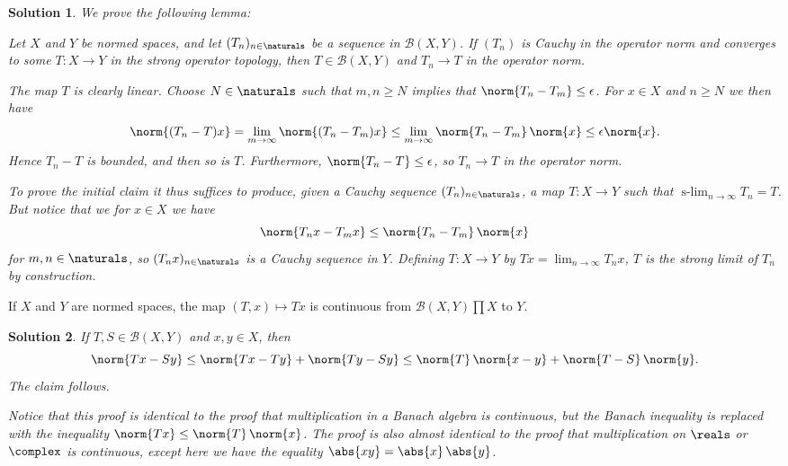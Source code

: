 \documentclass[article, a4paper, 11pt, oneside]{memoir}
\numberwithin{equation}{chapter}
\newcommand{\calB}{\mathcal{B}}
\DeclareMathOperator*{\slim}{s-lim}
\newenvironment{displaytheorem}{%
	\begin{displayquote}\itshape%
}{%
	\end{displayquote}%
}
\theoremstyle{nonumberplain}
\newtheorem{solution}{Solution}
\begin{document}
\begin{solution}
	We prove the following lemma:
	\begin{displaytheorem}
		Let $X$ and $Y$ be normed spaces, and let $(T_n)_{n\in\naturals}$ be a sequence in $\calB(X,Y)$. If $(T_n)$ is Cauchy in the operator norm and converges to some $T \colon X \to Y$ in the strong operator topology, then $T \in \calB(X,Y)$ and $T_n \to T$ in the operator norm.
	\end{displaytheorem}
	The map $T$ is clearly linear. Choose $N \in \naturals$ such that $m,n \geq N$ implies that $\norm{T_n - T_m} \leq \epsilon$. For $x \in X$ and $n \geq N$ we then have
	\begin{equation*}
		\norm{(T_n - T)x}
			= \lim_{m\to\infty} \norm{(T_n - T_m) x}
			\leq \lim_{m\to\infty} \norm{T_n - T_m} \, \norm{x}
			\leq \epsilon \norm{x}.
	\end{equation*}
	Hence $T_n - T$ is bounded, and then so is $T$. Furthermore, $\norm{T_n - T} \leq \epsilon$, so $T_n \to T$ in the operator norm.

	To prove the initial claim it thus suffices to produce, given a Cauchy sequence $(T_n)_{n\in\naturals}$, a map $T \colon X \to Y$ such that $\slim_{n\to\infty} T_n = T$. But notice that we for $x \in X$ we have
	\begin{equation*}
		\norm{T_n x - T_m x}
			\leq \norm{T_n - T_m} \, \norm{x}
	\end{equation*}
	for $m,n \in \naturals$, so $(T_n x)_{n\in\naturals}$ is a Cauchy sequence in $Y$. Defining $T \colon X \to Y$ by $Tx = \lim_{n\to\infty} T_n x$, $T$ is the strong limit of $T_n$ by construction.
\end{solution}


\begin{exerciseframed*}[4]
	If $X$ and $Y$ are normed spaces, the map $(T,x) \mapsto Tx$ is continuous from $\calB(X,Y) \prod X$ to $Y$.
\end{exerciseframed*}

\begin{solution}
	If $T,S \in \calB(X,Y)$ and $x,y \in X$, then
	\begin{equation*}
		\norm{Tx - Sy}
			\leq \norm{Tx - Ty} + \norm{Ty - Sy}
			\leq \norm{T} \, \norm{x - y} + \norm{T - S} \, \norm{y}.
	\end{equation*}
	The claim follows.

	Notice that this proof is identical to the proof that multiplication in a Banach algebra is continuous, but the Banach inequality is replaced with the inequality $\norm{Tx} \leq \norm{T} \, \norm{x}$. The proof is also almost identical to the proof that multiplication on $\reals$ or $\complex$ is continuous, except here we have the \emph{equality} $\abs{xy} = \abs{x} \, \abs{y}$.
\end{solution}
\end{document}
